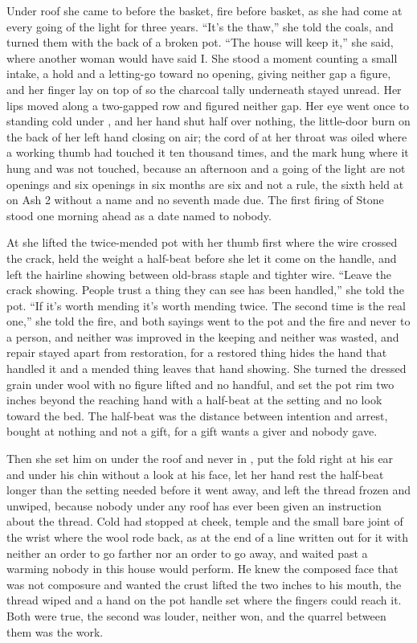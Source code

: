 Under  roof she came to  before the basket, fire before basket, as she had come at every going of the light for three years. “It's the thaw,” she told the coals, and turned them with the back of a broken pot. “The house will keep it,” she said, where another woman would have said I. She stood a moment counting a small intake, a hold and a letting-go toward no opening, giving neither gap a figure, and her finger lay on top of  so the charcoal tally underneath stayed unread. Her lips moved along a two-gapped row and figured neither gap. Her eye went once to  standing cold under , and her hand shut half over nothing, the little-door burn on the back of her left hand closing on air; the cord of  at her throat was oiled where a working thumb had touched it ten thousand times, and the mark hung where it hung and was not touched, because an afternoon and a going of the light are not openings and six openings in six months are six and not a rule, the sixth held at  on Ash 2 without a name and no seventh made due. The first firing of Stone stood one morning ahead as a date named to nobody.

At  she lifted the twice-mended pot with her thumb first where the wire crossed the crack, held the weight a half-beat before she let it come on the handle, and left the hairline showing between old-brass staple and tighter wire. “Leave the crack showing. People trust a thing they can see has been handled,” she told the pot. “If it's worth mending it's worth mending twice. The second time is the real one,” she told the fire, and both sayings went to the pot and the fire and never to a person, and neither was improved in the keeping and neither was wasted, and repair stayed apart from restoration, for a restored thing hides the hand that handled it and a mended thing leaves that hand showing. She turned the dressed grain under wool with no figure lifted and no handful, and set the pot rim two inches beyond the reaching hand with a half-beat at the setting and no look toward the bed. The half-beat was the distance between intention and arrest, bought at nothing and not a gift, for a gift wants a giver and nobody gave.

Then she set him on  under the roof and never in , put the fold right at his ear and under his chin without a look at his face, let her hand rest the half-beat longer than the setting needed before it went away, and left the thread frozen and unwiped, because nobody under any roof has ever been given an instruction about the thread. Cold had stopped at cheek, temple and the small bare joint of the wrist where the wool rode back, as at the end of a line written out for it with neither an order to go farther nor an order to go away, and  waited past a warming nobody in this house would perform. He knew the composed face that was not composure and wanted the crust lifted the two inches to his mouth, the thread wiped and a hand on the pot handle set where the fingers could reach it. Both were true, the second was louder, neither won, and the quarrel between them was the work.

